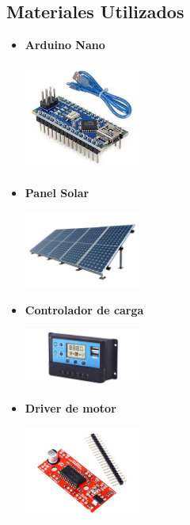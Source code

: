 \documentclass[12pt]{article}
\begin{document}
\subsection{Materiales Utilizados}
\begin{itemize}
      \item \textbf{Arduino Nano}
            \begin{center}
                  \includegraphics[width=0.3\textwidth]{imagenes/arduino.jpg}
            \end{center}

      \item \textbf{Panel Solar}
            \begin{center}
                  \includegraphics[width=0.3\textwidth]{imagenes/pane.png}
            \end{center}

      \item \textbf{Controlador de carga}
            \begin{center}
                  \includegraphics[width=0.3\textwidth]{imagenes/controlaor.png}
            \end{center}

      \item \textbf{Driver de motor}
            \begin{center}
                  \includegraphics[width=0.3\textwidth]{imagenes/motor.png}
            \end{center}


\end{itemize}
\end{document}
